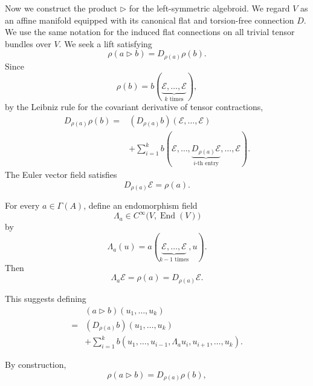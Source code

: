 \documentclass[12pt,reqno]{amsart}
\theoremstyle{definition}
\theoremstyle{remark}
\newcommand{\E}{\mathcal{E}}
\begin{document}
Now we construct the product $\triangleright$ for the left-symmetric algebroid. We regard \(V\) as an affine manifold equipped with its canonical
flat and torsion-free connection \(D\). We use the same notation
for the induced flat connections on all trivial tensor bundles over
\(V\).  We seek a lift satisfying
\[
\rho(a\triangleright b)
=
D_{\rho(a)}\rho(b).
\]
Since
\[
\rho(b)
=
b(\underbrace{\E,\ldots,\E}_{k\text{ times}}),
\]
by the Leibniz rule for the covariant derivative of tensor contractions,
\[
\begin{aligned}
D_{\rho(a)}\rho(b)
={}&
(D_{\rho(a)}b)(\E,\ldots,\E)
\\
&+
\sum_{i=1}^k
b(\E,\ldots,
\underbrace{D_{\rho(a)}\E}_{i\text{-th entry}},
\ldots,\E).
\end{aligned}
\]
The Euler vector field satisfies
\[
D_{\rho(a)}\E=\rho(a).
\]

For every \(a\in\Gamma(A)\), define an endomorphism field
\[
\Lambda_a
\in
C^\infty\bigl(V,\operatorname{End}(V)\bigr)
\]
by
\begin{equation}
\Lambda_a(u)
=
a(\underbrace{\E,\ldots,\E}_{k-1\text{ times}},u).
\label{eq:Lambda}
\end{equation}
Then
\begin{equation}\label{eq:Lambda-anchor}
\Lambda_a\E
=
\rho(a)
=
D_{\rho(a)}\E.    
\end{equation}

This suggests defining
\begin{equation}\label{eq:left-symmetric-product-expanded}
\begin{aligned}
&(a\triangleright b)(u_1,\ldots,u_k)
\\
={}&
(D_{\rho(a)}b)(u_1,\ldots,u_k)
\\
&+
\sum_{i=1}^k
b(u_1,\ldots,u_{i-1},
\Lambda_a u_i,
u_{i+1},\ldots,u_k).
\end{aligned}    
\end{equation}

By construction,
\begin{equation}
\rho(a\triangleright b)
=
D_{\rho(a)}\rho(b),
\label{eq:rho-product-identity}
\end{equation}


\end{document}

